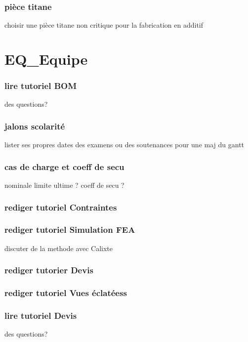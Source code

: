 		\subsubsection*{pièce titane} 
 \par choisir une pièce titane non critique pour la fabrication en additif
\newpage 
 \section*{EQ\_Equipe} 
 \par 
		\subsubsection*{lire tutoriel BOM} 
 \par des questions?
		\subsubsection*{jalons scolarité} 
 \par lister ses propres dates des examens ou des soutenances pour une maj du gantt
		\subsubsection*{cas de charge et coeff de secu} 
 \par nominale limite ultime ? coeff de secu ?
		\subsubsection*{rediger tutoriel Contraintes} 
 \par 
		\subsubsection*{rediger tutoriel Simulation FEA} 
 \par discuter de la methode avec Calixte
		\subsubsection*{rediger tutorier Devis} 
 \par 
		\subsubsection*{rediger tutoriel Vues éclatéess} 
 \par 
		\subsubsection*{lire tutoriel Devis} 
 \par des questions?
